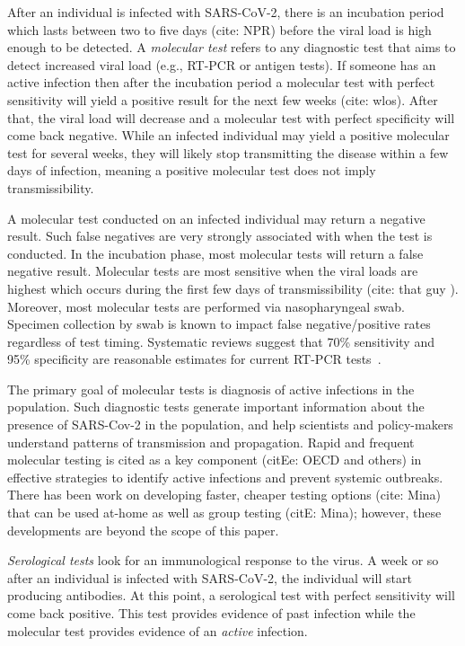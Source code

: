 \documentclass[12pt]{amsart}
\numberwithin{equation}{section}
\theoremstyle{plain}
\begin{document}
After an individual is infected with SARS-CoV-2, there is an incubation period which lasts between two to five days (cite: NPR) before the viral load is high enough to be detected.  A \emph{molecular test} refers to any diagnostic test that aims to detect increased viral load (e.g., RT-PCR or antigen tests).  If someone has an active infection then after the incubation period a molecular test with perfect sensitivity will yield a positive result for the next few weeks (cite: wlos).  After that, the viral load will decrease and a molecular test with perfect specificity will come back negative. While an infected individual may yield a positive molecular test for several weeks, they will likely stop transmitting the disease within a few days of infection, meaning a positive molecular test does not imply transmissibility.

A molecular test conducted on an infected individual may return a negative result.  Such false negatives are very strongly associated with when the test is conducted.  In the incubation phase, most molecular tests will return a false negative result.  Molecular tests are most sensitive when the viral loads are highest which occurs during the first few days of transmissibility (cite: that guy ).   Moreover, most molecular tests are performed via nasopharyngeal swab.  Specimen collection by swab is known to impact false negative/positive rates regardless of test timing.   Systematic reviews suggest that 70\% sensitivity and 95\% specificity are reasonable estimates for current RT-PCR tests~\cite{Woloshin2020}.

The primary goal of molecular tests is diagnosis of active infections in the population.  Such diagnostic tests generate important information about the presence of SARS-Cov-2 in the population, and help scientists and policy-makers understand patterns of transmission and propagation. Rapid and frequent molecular testing is cited as a key component (citEe: OECD and others) in effective strategies to identify active infections and prevent systemic outbreaks.  There has been work on developing faster, cheaper testing options (cite: Mina) that can be used at-home as well as group testing (citE: Mina); however, these developments are beyond the scope of this paper.

\emph{Serological tests} look for an immunological response to the virus.  A week or so after an individual is infected with SARS-CoV-2, the individual will start producing antibodies.  At this point, a serological test with perfect sensitivity will come back positive.  This test provides evidence of past infection while the molecular test provides evidence of an \emph{active} infection.
\end{document}
